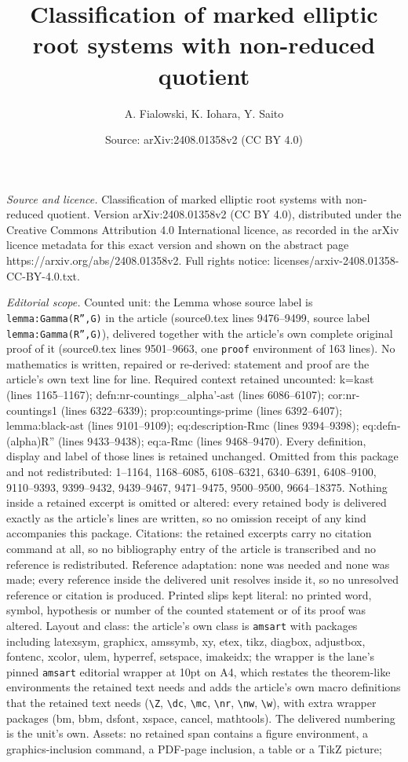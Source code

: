 \documentclass[10pt,a4paper]{amsart}
\title[Classification of marked elliptic root systems with non-redu]{Classification of marked elliptic root systems with non-reduced quotient}
\author{A. Fialowski, K. Iohara, Y. Saito}
\date{Source: arXiv:2408.01358v2 (CC BY 4.0)}
\begin{document}
\maketitle

\noindent\emph{Source and licence.} Classification of marked elliptic root systems with non-reduced quotient. Version arXiv:2408.01358v2 (CC BY 4.0), distributed under the Creative Commons Attribution 4.0 International licence, as recorded in the arXiv licence metadata for this exact version and shown on the abstract page https://arxiv.org/abs/2408.01358v2. Full rights notice: licenses/arxiv-2408.01358-CC-BY-4.0.txt.\par\smallskip

\noindent\textit{Editorial scope.} Counted unit: the Lemma whose source label is \texttt{lemma:Gamma(R'',G)} in the article (source0.tex lines 9476--9499, source label \texttt{lemma:Gamma(R'',G)}), delivered together with the article's own complete original proof of it (source0.tex lines 9501--9663, one \texttt{proof} environment of 163 lines). No mathematics is written, repaired or re-derived: statement and proof are the article's own text line for line. Required context retained uncounted: k=kast (lines 1165--1167); defn:nr-countings\_alpha'-ast (lines 6086--6107); cor:nr-countings1 (lines 6322--6339); prop:countings-prime (lines 6392--6407); lemma:black-ast (lines 9101--9109); eq:description-Rmc (lines 9394--9398); eq:defn-(alpha)R'' (lines 9433--9438); eq:a-Rmc (lines 9468--9470). Every definition, display and label of those lines is retained unchanged. Omitted from this package and not redistributed: 1--1164, 1168--6085, 6108--6321, 6340--6391, 6408--9100, 9110--9393, 9399--9432, 9439--9467, 9471--9475, 9500--9500, 9664--18375. Nothing inside a retained excerpt is omitted or altered: every retained body is delivered exactly as the article's lines are written, so no omission receipt of any kind accompanies this package. Citations: the retained excerpts carry no citation command at all, so no bibliography entry of the article is transcribed and no reference is redistributed. Reference adaptation: none was needed and none was made; every reference inside the delivered unit resolves inside it, so no unresolved reference or citation is produced. Printed slips kept literal: no printed word, symbol, hypothesis or number of the counted statement or of its proof was altered. Layout and class: the article's own class is \texttt{amsart} with packages including latexsym, graphicx, amssymb, xy, etex, tikz, diagbox, adjustbox, fontenc, xcolor, ulem, hyperref, setspace, imakeidx; the wrapper is the lane's pinned \texttt{amsart} editorial wrapper at 10pt on A4, which restates the theorem-like environments the retained text needs and adds the article's own macro definitions that the retained text needs (\texttt{\textbackslash Z}, \texttt{\textbackslash dc}, \texttt{\textbackslash mc}, \texttt{\textbackslash nr}, \texttt{\textbackslash nw}, \texttt{\textbackslash w}), with extra wrapper packages (bm, bbm, dsfont, xspace, cancel, mathtools). The delivered numbering is the unit's own. Assets: no retained span contains a figure environment, a graphics-inclusion command, a PDF-page inclusion, a table or a TikZ picture; 
\end{document}
